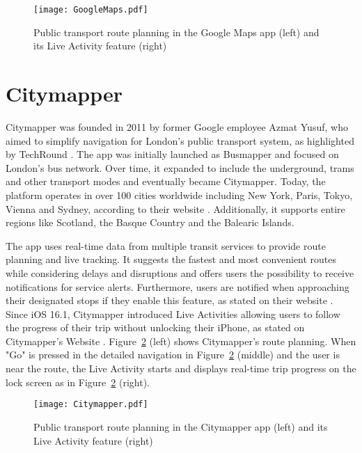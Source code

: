 \begin{figure}[htbp]
    \centering
    \texttt{[image: GoogleMaps.pdf]}
    \caption{Public transport route planning in the Google Maps app (left) and its Live Activity feature (right)}
    \label{fig:GoogleMaps}
\end{figure}

\section{Citymapper}
Citymapper was founded in 2011 by former Google employee Azmat Yusuf, who aimed to simplify navigation for London's public transport system, as highlighted by TechRound \cite{citymapper_profile}.
The app was initially launched as Busmapper and focused on London's bus network.
Over time, it expanded to include the underground, trams and other transport modes and eventually became Citymapper.
Today, the platform operates in over 100 cities worldwide including New York, Paris, Tokyo, Vienna and Sydney, according to their website \cite{citymapper_cities}.
Additionally, it supports entire regions like Scotland, the Basque Country and the Balearic Islands.

The app uses real-time data from multiple transit services to provide route planning and live tracking.
It suggests the fastest and most convenient routes while considering delays and disruptions and offers users the possibility to receive notifications for service alerts.
Furthermore, users are notified when approaching their designated stops if they enable this feature, as stated on their website \cite{citymapper_getoffalerts}.
Since iOS 16.1, Citymapper introduced Live Activities allowing users to follow the progress of their trip without unlocking their iPhone, as stated on Citymapper's Website \cite{citymapper_ios_lock_screen_navigation}.
Figure~\ref{fig:Citymapper} (left) shows Citymapper's route planning. 
When "Go" is pressed in the detailed navigation in Figure~\ref{fig:Citymapper} (middle) and the user is near the route, the Live Activity starts and displays real-time trip progress on the lock screen as in Figure~\ref{fig:Citymapper} (right).

\begin{figure}[htbp]
    \centering
    \texttt{[image: Citymapper.pdf]}
    \caption{Public transport route planning in the Citymapper app (left) and its Live Activity feature (right) \cite{citymapper_ios_lock_screen_navigation}}
    \label{fig:Citymapper}
\end{figure}

